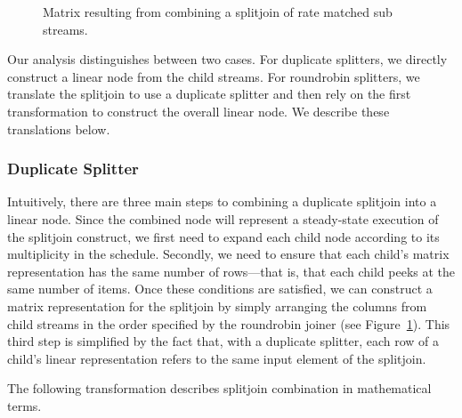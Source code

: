 {\begin{figure}[t]
\center
\epsfxsize=3.2in
\caption{Matrix resulting from combining a splitjoin of rate matched sub streams.
\protect\label{fig:splitjoin-duplicate-matrix}}
\vspace{-12pt}
\end{figure}

Our analysis distinguishes between two cases. For duplicate
splitters, we directly construct a linear node from the child streams.
For roundrobin splitters, we translate the splitjoin to use a
duplicate splitter and then rely on the first transformation to construct 
the overall linear node.  We describe these translations below.

\subsubsection{Duplicate Splitter}

Intuitively, there are three main steps to combining a duplicate
splitjoin into a linear node.  Since the combined node will represent
a steady-state execution of the splitjoin construct, we first need to
expand each child node according to its multiplicity in the schedule.
Secondly, we need to ensure that each child's matrix representation
has the same number of rows---that is, that each child peeks at the
same number of items.  Once these conditions are satisfied, we can
construct a matrix representation for the splitjoin by simply
arranging the columns from child streams in the order specified by the
roundrobin joiner (see Figure~\ref{fig:splitjoin-duplicate-matrix}).
This third step is simplified by the fact that, with a duplicate
splitter, each row of a child's linear representation refers to the
same input element of the splitjoin.

The following transformation describes splitjoin combination in
mathematical terms.


}
